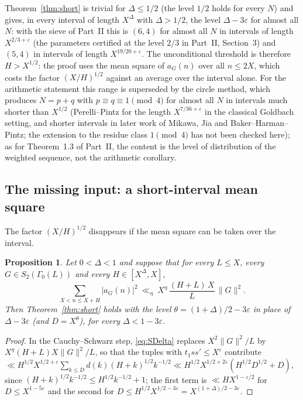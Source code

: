 \documentclass[11pt,a4paper]{article}
\newtheorem{proposition}[theorem]{Proposition}
\theoremstyle{remark}
\theoremstyle{definition}
\newcommand{\e}{\varepsilon}
\begin{document}
Theorem~\ref{thm:short} is trivial for $\Delta\le1/2$ (the level $1/2$ holds for every $N$) and gives, in every interval of length $X^\Delta$ with $\Delta>1/2$, the level $\Delta-3\e$ for almost all $N$: with the sieve of Part~II this is $(6,4)$ for almost all $N$ in intervals of length $X^{2/3+\e}$ (the parameters certified at the level $2/3$ in Part~II, Section~3) and $(5,4)$ in intervals of length $X^{19/20+\e}$. The unconditional threshold is therefore $H>X^{1/2}$: the proof uses the mean square of $a_G(n)$ over all $n\le2X$, which costs the factor $(X/H)^{1/2}$ against an average over the interval alone. For the arithmetic statement this range is superseded by the circle method, which produces $N=p+q$ with $p\equiv q\equiv1\pmod 4$ for almost all $N$ in intervals much shorter than $X^{1/2}$ (Perelli--Pintz for the length $X^{7/36+\e}$ in the classical Goldbach setting, and shorter intervals in later work of Mikawa, Jia and Baker--Harman--Pintz; the extension to the residue class $1\pmod4$ has not been checked here); as for Theorem~1.3 of Part~II, the content is the level of distribution of the weighted sequence, not the arithmetic corollary.

\subsection{The missing input: a short-interval mean square}
The factor $(X/H)^{1/2}$ disappears if the mean square can be taken over the interval.

\begin{proposition}\label{prop:shortcond}
Let $0<\Delta<1$ and suppose that for every $L\le X$, every $G\in S_2(\Gamma_0(L))$ and every $H\in[X^\Delta,X]$,
\begin{equation}\label{eq:SDelta}
\sum_{X<n\le X+H}|a_G(n)|^2\ \ll_\eta\ X^{\eta}\,\frac{(H+L)\,X}{L}\,\|G\|^2 .
\end{equation}
Then Theorem~\ref{thm:short} holds with the level $\theta=(1+\Delta)/2-3\e$ in place of $\Delta-3\e$ (and $D=X^{\theta}$), for every $\Delta<1-3\e$.
\end{proposition}
\begin{proof}
In the Cauchy--Schwarz step, \eqref{eq:SDelta} replaces $X^2\|G\|^2/L$ by $X^{\eta}(H+L)X\|G\|^2/L$, so that the tuples with $t_1ss'\le X^\e$ contribute $\ll H^{1/2}X^{1/2+\e}\sum_{k\le D}d(k)(H+k)^{1/2}k^{-1/2}\ll H^{1/2}X^{1/2+2\e}(H^{1/2}D^{1/2}+D)$, since $(H+k)^{1/2}k^{-1/2}\le H^{1/2}k^{-1/2}+1$; the first term is $\ll HX^{1-\e/2}$ for $D\le X^{1-5\e}$ and the second for $D\le H^{1/2}X^{1/2-3\e}=X^{(1+\Delta)/2-3\e}$.
\end{proof}
\end{document}

